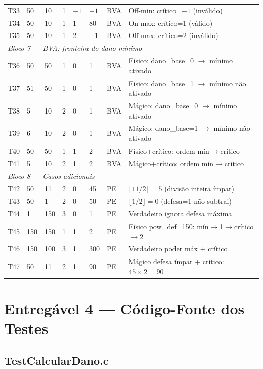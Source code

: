 \documentclass[conference, onecolumn]{IEEEtran}
\begin{document}
\begin{longtable}{@{}p{0.5cm}p{0.8cm}p{0.8cm}p{0.5cm}p{0.7cm}p{1.0cm}p{0.9cm}p{3.5cm}@{}}
T33 & 50 & 10 & 1 & $-1$ & $-1$ & BVA & Off-min: crítico=$-1$ (inválido) \\
T34 & 50 & 10 & 1 & 1  & 80   & BVA & On-max: crítico=1 (válido) \\
T35 & 50 & 10 & 1 & 2  & $-1$ & BVA & Off-max: crítico=2 (inválido) \\
\midrule
\multicolumn{8}{l}{\textit{Bloco 7 — BVA: fronteira do dano mínimo}} \\
T36 & 50 & 50 & 1 & 0 & 1 & BVA & Físico: dano\_base=0 $\to$ mínimo ativado \\
T37 & 51 & 50 & 1 & 0 & 1 & BVA & Físico: dano\_base=1 $\to$ mínimo não ativado \\
T38 & 5  & 10 & 2 & 0 & 1 & BVA & Mágico: dano\_base=0 $\to$ mínimo ativado \\
T39 & 6  & 10 & 2 & 0 & 1 & BVA & Mágico: dano\_base=1 $\to$ mínimo não ativado \\
T40 & 50 & 50 & 1 & 1 & 2 & BVA & Físico+crítico: ordem mín$\to$crítico \\
T41 & 5  & 10 & 2 & 1 & 2 & BVA & Mágico+crítico: ordem mín$\to$crítico \\
\midrule
\multicolumn{8}{l}{\textit{Bloco 8 — Casos adicionais}} \\
T42 & 50  & 11  & 2 & 0 & 45  & PE & $\lfloor 11/2 \rfloor = 5$ (divisão inteira ímpar) \\
T43 & 50  & 1   & 2 & 0 & 50  & PE & $\lfloor 1/2 \rfloor = 0$ (defesa=1 não subtrai) \\
T44 & 1   & 150 & 3 & 0 & 1   & PE & Verdadeiro ignora defesa máxima \\
T45 & 150 & 150 & 1 & 1 & 2   & PE & Físico pow=def=150: mín$\to$1$\to$crítico$\to$2 \\
T46 & 150 & 100 & 3 & 1 & 300 & PE & Verdadeiro poder máx + crítico \\
T47 & 50  & 11  & 2 & 1 & 90  & PE & Mágico defesa ímpar + crítico: $45\times2=90$ \\
\end{longtable}

\section{Entregável 4 — Código-Fonte dos Testes}

\subsection{TestCalcularDano.c}
\end{document}
